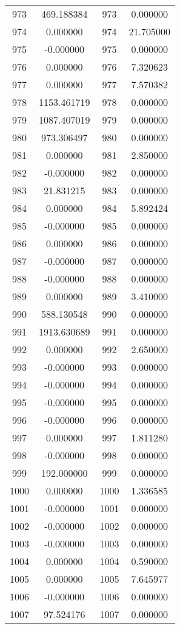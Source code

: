 \documentclass[12pt]{article}
\begin{document}
\begin{longtable}{@{}cccc@{}}
973 & 469.188384 & 973 & 0.000000 \\
974 & 0.000000 & 974 & 21.705000 \\
975 & -0.000000 & 975 & 0.000000 \\
976 & 0.000000 & 976 & 7.320623 \\
977 & 0.000000 & 977 & 7.570382 \\
978 & 1153.461719 & 978 & 0.000000 \\
979 & 1087.407019 & 979 & 0.000000 \\
980 & 973.306497 & 980 & 0.000000 \\
981 & 0.000000 & 981 & 2.850000 \\
982 & -0.000000 & 982 & 0.000000 \\
983 & 21.831215 & 983 & 0.000000 \\
984 & 0.000000 & 984 & 5.892424 \\
985 & -0.000000 & 985 & 0.000000 \\
986 & 0.000000 & 986 & 0.000000 \\
987 & -0.000000 & 987 & 0.000000 \\
988 & -0.000000 & 988 & 0.000000 \\
989 & 0.000000 & 989 & 3.410000 \\
990 & 588.130548 & 990 & 0.000000 \\
991 & 1913.630689 & 991 & 0.000000 \\
992 & 0.000000 & 992 & 2.650000 \\
993 & -0.000000 & 993 & 0.000000 \\
994 & -0.000000 & 994 & 0.000000 \\
995 & -0.000000 & 995 & 0.000000 \\
996 & -0.000000 & 996 & 0.000000 \\
997 & 0.000000 & 997 & 1.811280 \\
998 & -0.000000 & 998 & 0.000000 \\
999 & 192.000000 & 999 & 0.000000 \\
1000 & 0.000000 & 1000 & 1.336585 \\
1001 & -0.000000 & 1001 & 0.000000 \\
1002 & -0.000000 & 1002 & 0.000000 \\
1003 & -0.000000 & 1003 & 0.000000 \\
1004 & 0.000000 & 1004 & 0.590000 \\
1005 & 0.000000 & 1005 & 7.645977 \\
1006 & -0.000000 & 1006 & 0.000000 \\
1007 & 97.524176 & 1007 & 0.000000 \\

\end{longtable}
\end{document}
